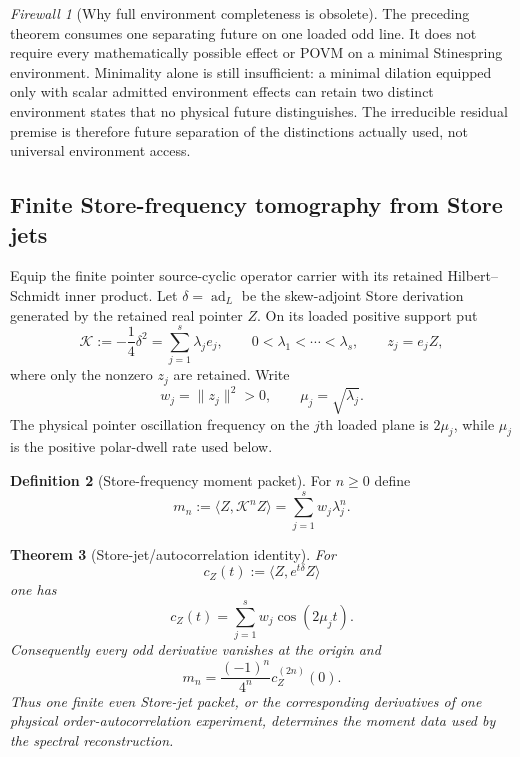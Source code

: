 \documentclass[11pt]{article}
\newtheorem{theorem}{Theorem}[section]
\theoremstyle{definition}
\newtheorem{definition}[theorem]{Definition}
\theoremstyle{remark}
\newtheorem{firewall}[theorem]{Firewall}
\newcommand{\norm}[1]{\lVert#1\rVert}
\begin{document}
\begin{firewall}[Why full environment completeness is obsolete]
The preceding theorem consumes one separating future on one loaded odd line.
It does not require every mathematically possible effect or POVM on a minimal
Stinespring environment.  Minimality alone is still insufficient: a minimal
dilation equipped only with scalar admitted environment effects can retain two
distinct environment states that no physical future distinguishes.  The
irreducible residual premise is therefore future separation of the distinctions
actually used, not universal environment access.
\end{firewall}


\subsection{Finite Store-frequency tomography from Store jets}
\label{sec:store-frequency-tomography-master}

Equip the finite pointer source-cyclic operator carrier with its retained
Hilbert--Schmidt inner product.  Let $\delta=\operatorname{ad}_L$ be the
skew-adjoint Store derivation generated by the retained real pointer $Z$.  On its loaded positive support put
\[
  \mathscr K:=-\frac14\delta^2
  =\sum_{j=1}^{s}\lambda_je_j,
  \qquad
  0<\lambda_1<\cdots<\lambda_s,
  \qquad
  z_j=e_jZ,
\]
where only the nonzero $z_j$ are retained.  Write
\[
  w_j=\norm{z_j}^2>0,
  \qquad
  \mu_j=\sqrt{\lambda_j}.
\]
The physical pointer oscillation frequency on the $j$th loaded plane is
$2\mu_j$, while $\mu_j$ is the positive polar-dwell rate used below.

\begin{definition}[Store-frequency moment packet]
\label{def:store-frequency-moments-master}
For $n\ge0$ define
\begin{equation}
  \boxed{
  m_n:=\langle Z,\mathscr K^nZ\rangle
      =\sum_{j=1}^{s}w_j\lambda_j^n.}
  \label{eq:store-frequency-moments-master}
\end{equation}
\end{definition}

\begin{theorem}[Store-jet/autocorrelation identity]
\label{thm:store-autocorrelation-master}
For
\[
  c_Z(t):=\langle Z,e^{t\delta}Z\rangle
\]
one has
\begin{equation}
  \boxed{c_Z(t)=\sum_{j=1}^{s}w_j\cos(2\mu_jt).}
  \label{eq:store-autocorrelation-master}
\end{equation}
Consequently every odd derivative vanishes at the origin and
\begin{equation}
  \boxed{m_n=\frac{(-1)^n}{4^n}c_Z^{(2n)}(0).}
  \label{eq:store-jet-moments-master}
\end{equation}
Thus one finite even Store-jet packet, or the corresponding derivatives of one
physical order-autocorrelation experiment, determines the moment data used by
the spectral reconstruction.
\end{theorem}
\end{document}
